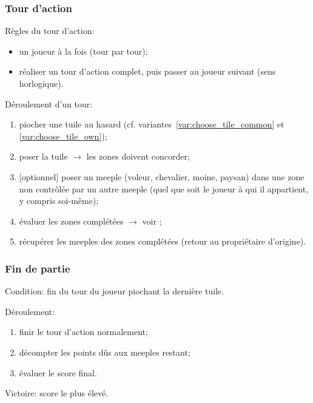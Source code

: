 \documentclass[11pt]{beamer}
\begin{document}
\begin{frame}
	\frametitle{Tour d'action}
	
	Règles du tour d'action:
	\begin{itemize}
		\item un joueur à la fois (tour par tour);
		\item réaliser un tour d'action complet, puis passer au joueur suivant (sens horlogique).
	\end{itemize}

	\vspace*{1ex}
	
	Déroulement d'un tour:
	\begin{enumerate}
		\item piocher une tuile au hasard (cf. variantes~\ref{var:choose_tile_common} et \ref{var:choose_tile_own});
		\item poser la tuile $\rightarrow$ les zones doivent concorder;
		\item{}[optionnel] poser un meeple (voleur, chevalier, moine, paysan) dans une zone non contrôlée par un autre meeple (quel que soit le joueur à qui il appartient, y compris soi-même);
		\item évaluer les zones complétées $\rightarrow$ voir \hyperlink{frame:score}{};
		\item récupérer les meeples des zones complétées (retour au propriétaire d'origine).
	\end{enumerate}
\end{frame}

\begin{frame}
	\frametitle{Fin de partie}
	
	Condition: fin du tour du joueur piochant la dernière tuile.
	
	\vspace*{1ex}
	
	Déroulement:
	\begin{enumerate}
		\item finir le tour d'action normalement;
		\item décompter les points dûs aux meeples restant;
		\item évaluer le score final.
	\end{enumerate}

	\vspace*{1ex}
	
	Victoire: score le plus élevé.
\end{frame}
\end{document}
